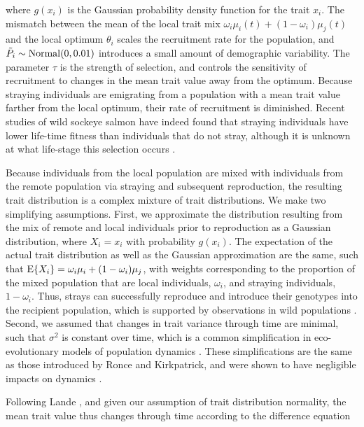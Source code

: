 \documentclass{revtex4}
\begin{document}
\noindent where $g(x_i)$ is the Gaussian probability density function for the trait $x_i$. The mismatch between the mean of the local trait mix $\omega_i\mu_i(t) + (1-\omega_i)\mu_j(t)$ and the local optimum $\theta_i$ scales the recruitment rate for the population, and $\tilde{P}_i\sim {\rm Normal}(0,0.01)$ introduces a small amount of demographic variability.
The parameter $\tau$ is the strength of selection, and controls the sensitivity of recruitment to changes in the mean trait value away from the optimum.
Because straying individuals are emigrating from a population with a mean trait value farther from the local optimum, their rate of recruitment is diminished.
Recent studies of wild sockeye salmon have indeed found that straying individuals have lower life-time fitness than individuals that do not stray, although it is unknown at what life-stage this selection occurs \citep{Peterson:2014gy}.


Because individuals from the local population are mixed with individuals from the remote population via straying and subsequent reproduction, the resulting trait distribution is a complex mixture of trait distributions.
We make two simplifying assumptions.
First, we approximate the distribution resulting from the mix of remote and local individuals prior to reproduction as a Gaussian distribution, where $X_i=x_i$ with probability $g(x_i)$.
The expectation of the actual trait distribution as well as the Gaussian approximation are the same, such that ${\rm E}\{X_i\} = \omega_i\mu_i + (1-\omega_i)\mu_j$, with weights corresponding to the proportion of the mixed population that are local individuals, $\omega_i$, and straying individuals, $1-\omega_i$.
Thus, strays can successfully reproduce and introduce their genotypes into the recipient population, which is supported by observations in wild populations \citep{Jasper:2013cc}.
Second, we assumed that changes in trait variance through time are minimal, such that $\sigma^2$ is constant over time, which is a common simplification in eco-evolutionary models of population dynamics \citep{Lande:1976ga,Ronce:2001dp,Schreiber:2011wx,Gilbert:2014ee,Gibert:2015kc}.
These simplifications are the same as those introduced by Ronce and Kirkpatrick, and were shown to have negligible impacts on dynamics \citep{Ronce:2001dp}.



Following Lande \citep{Lande:1976ga}, and given our assumption of trait distribution normality, the mean trait value thus changes through time according to the difference equation
\end{document}
